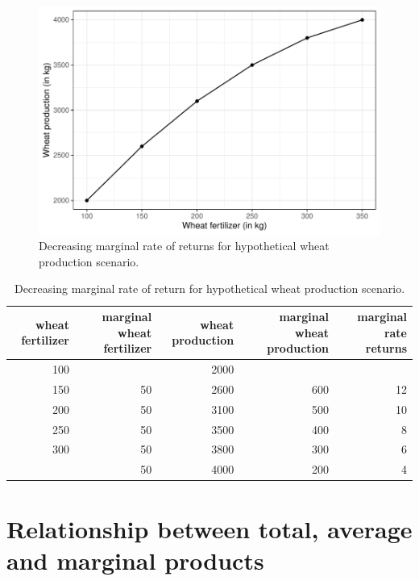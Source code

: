 \documentclass[12pt,ignorenonframetext,aspectratio=169]{beamer}
\begin{document}
\begin{frame}{}
\protect\hypertarget{section-7}{}
\begin{figure}
\includegraphics[width=0.7\linewidth]{production_relationship_files/figure-beamer/nitrogen-wheat-dmr-fig-1} \caption{Decreasing marginal rate of returns for hypothetical wheat production scenario.}\label{fig:nitrogen-wheat-dmr-fig}
\end{figure}
\end{frame}

\begin{frame}{}
\protect\hypertarget{section-8}{}
\begin{table}

\caption{\label{tab:nitrogen-wheat-dmr-tab}Decreasing marginal rate of return for hypothetical wheat production scenario.}
\centering
\fontsize{6}{8}\selectfont
\begin{tabular}[t]{rrrrr}
\toprule
wheat fertilizer & marginal wheat fertilizer & wheat production & marginal wheat production & marginal rate returns\\
\midrule
100 &  & 2000 &  & \\
150 & 50 & 2600 & 600 & 12\\
200 & 50 & 3100 & 500 & 10\\
250 & 50 & 3500 & 400 & 8\\
300 & 50 & 3800 & 300 & 6\\
\addlinespace
350 & 50 & 4000 & 200 & 4\\
\bottomrule
\end{tabular}
\end{table}
\end{frame}

\hypertarget{relationship-between-total-average-and-marginal-products}{%
\section{Relationship between total, average and marginal
products}\label{relationship-between-total-average-and-marginal-products}}
\end{document}
